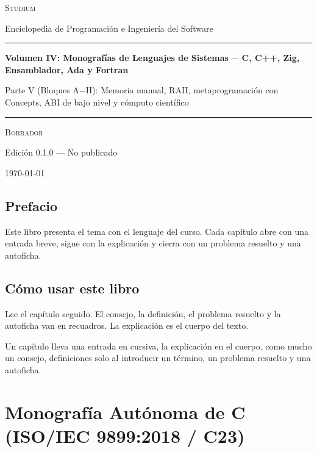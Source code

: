 \documentclass{book}
\begin{document}
\frontmatter
\thispagestyle{empty}
\setlength{\parindent}{0pt}
\vspace*{0.08\textheight}
{\normalsize\scshape\color{studiumInk} Studium\par}
{\small Enciclopedia de Programación e Ingeniería del Software\par}
\vspace{0.55em}
{\color{studiumRule}\rule{\linewidth}{0.9pt}\par}
\vspace{0.16\textheight}
{\raggedright\Huge\bfseries Volumen IV: Monografías de Lenguajes de Sistemas \(-\) C, C++, Zig, Ensamblador, Ada y Fortran\par}
\vspace{0.9em}
{\raggedright\Large\color{studiumInk} Parte V (Bloques A\(-\)H): Memoria manual, RAII, metaprogramación con Concepts, ABI de bajo nivel y cómputo científico\par}
\vfill
{\color{studiumRule}\rule{0.36\linewidth}{0.45pt}\par}
\vspace{1.05em}
{\large\scshape Borrador\par}
\vspace{0.45em}
{\normalsize Edición 0.1.0 --- No publicado\par}
\vspace{0.4em}
{\normalsize\today\par}
\vspace*{0.08\textheight}
\clearpage
\chapter{Prefacio}
\noindent Este libro presenta el tema con el lenguaje del curso. Cada capítulo abre con una entrada breve, sigue con la explicación y cierra con un problema resuelto y una autoficha.
\chapter{Cómo usar este libro}
\noindent Lee el capítulo seguido. El consejo, la definición, el problema resuelto y la autoficha van en recuadros. La explicación es el cuerpo del texto.

\noindent Un capítulo lleva una entrada en cursiva, la explicación en el cuerpo, como mucho un consejo, definiciones solo al introducir un término, un problema resuelto y una autoficha.
\tableofcontents
\mainmatter

\part{Monografía Autónoma de C (ISO/IEC 9899:2018 / C23)}
\end{document}
